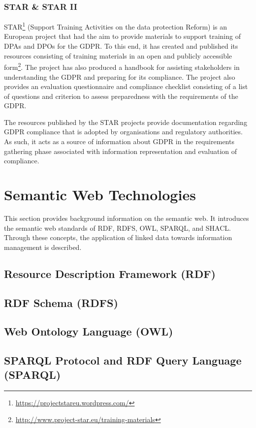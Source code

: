 \subsubsection{STAR \& STAR II}
STAR\footnote{\url{https://projectstareu.wordpress.com/}} (Support Training Activities on the data protection Reform) is an European project that had the aim to provide materials to support training of DPAs and DPOs for the GDPR. To this end, it has created and published its resources consisting of training materials in an open and publicly accessible form\footnote{\url{http://www.project-star.eu/training-materials}}. The project has also produced a handbook for assisting stakeholders in understanding the GDPR and preparing for its compliance. The project also provides an evaluation questionnaire and compliance checklist \cite{noauthor_gdpr_2019-1}consisting of a list of questions and criterion to assess preparedness with the requirements of the GDPR. 

The resources published by the STAR projects provide documentation regarding GDPR compliance that is adopted by organisations and regulatory authorities. As such, it acts as a source of information about GDPR in the requirements gathering phase associated with information representation and evaluation of compliance.

\section{Semantic Web Technologies}\label{sec:background:semweb}
This section provides background information on the semantic web. It introduces the semantic web standards of RDF, RDFS, OWL, SPARQL, and SHACL.
Through these concepts, the application of linked data towards information management is described.

\subsection{Resource Description Framework (RDF)}

\subsection{RDF Schema (RDFS)}

\subsection{Web Ontology Language (OWL)}

\subsection{SPARQL Protocol and RDF Query Language (SPARQL)}

